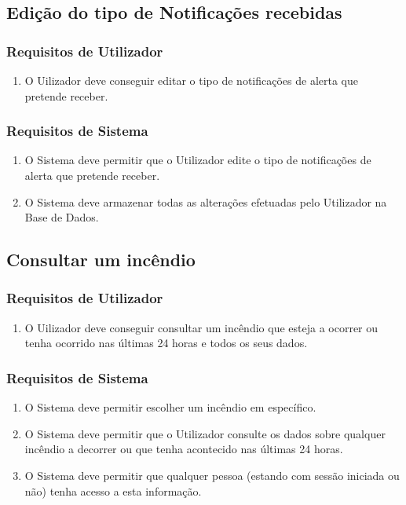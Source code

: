 \documentclass[a4paper,12pt]{scrreprt}
\begin{document}
\subsection{Edição do tipo de Notificações recebidas}

\subsubsection{Requisitos de Utilizador}

\begin{enumerate}
    \item O Uilizador deve conseguir editar o tipo de notificações de alerta que pretende receber.
\end{enumerate}

\subsubsection{Requisitos de Sistema }

\begin{enumerate}
    \item O Sistema deve permitir que o Utilizador edite o tipo de notificações de alerta que pretende receber.
    \item O Sistema deve armazenar todas as alterações efetuadas pelo Utilizador na Base de Dados.
\end{enumerate}

\clearpage
\subsection{Consultar um incêndio}

\subsubsection{Requisitos de Utilizador}

\begin{enumerate}
    \item O Uilizador deve conseguir consultar um incêndio que esteja a ocorrer ou tenha ocorrido nas últimas 24 horas e todos os seus dados.
\end{enumerate}

\subsubsection{Requisitos de Sistema }

\begin{enumerate}
    \item O Sistema deve permitir escolher um incêndio em específico.
    \item O Sistema deve permitir que o Utilizador consulte os dados sobre qualquer incêndio a decorrer ou que tenha acontecido nas últimas 24 horas.
    \item O Sistema deve permitir que qualquer pessoa (estando com sessão iniciada ou não) tenha acesso a esta informação.
\end{enumerate}
\end{document}
